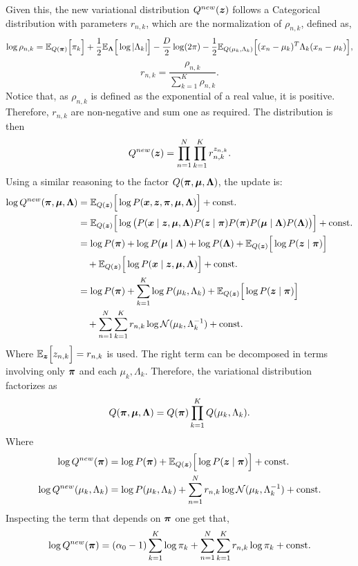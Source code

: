 Given this, the new variational distribution \(Q^{new}(\bm{z})\) follows a Categorical distribution with parameters \(r_{n,k}\), which are the normalization of \(\rho_{n,k}\), defined as,
\[
  \log \rho_{n,k} = \mathbb{E}_{Q(\bm{\pi})}\Big[\pi_{k}\Big] + \frac{1}{2}\mathbb{E}_{\bm{\Lambda}}\Big[\log | \Lambda_{k}|\Big] - \frac{D}{2} \log (2\pi) - \frac{1}{2}\mathbb{E}_{Q(\mu_{k}, \Lambda_{k})}\Big[(x_{n} - \mu_{k})^{T}\Lambda_{k}(x_{n} - \mu_{k})\Big],
\]
\[
  r_{n,k} = \frac{\rho_{n,k}}{\sum_{k=1}^{K}\rho_{n,k}}.
\]
Notice that, as \(\rho_{n,k}\) is defined as the exponential of a real value, it is positive. Therefore, \(r_{n,k}\) are non-negative and sum one as required.
The distribution is then
\[
  Q^{new}(\bm{z}) = \prod_{n=1}^{N}\prod_{k=1}^{K} r_{n,k}^{z_{n,k}}.
\]
Using a similar reasoning to the factor \(Q(\bm{\pi}, \bm{\mu}, \bm{\Lambda})\), the update is:
\[
  \begin{aligned}
    \log Q^{new}(\bm{\pi}, \bm{\mu}, \bm{\Lambda}) &= \mathbb{E}_{Q(\bm{z})}\Big[\log P(\bm{x}, \bm{z}, \bm{\pi}, \bm{\mu}, \bm{\Lambda})\Big] + \text{const.}\\
    &=  \mathbb{E}_{Q(\bm{z})}\Big[\log \big( P(\bm{x} \mid \bm{z}, \bm{\mu}, \bm{\Lambda})P(\bm{z} \mid \bm{\pi})P(\bm{\pi})P(\bm{\mu} \mid \bm{\Lambda})P(\bm{\Lambda}) \big)\Big] + \text{const.}\\
    &=  \log P(\bm{\pi}) + \log P(\bm{\mu} \mid \bm{\Lambda})+ \log P(\bm{\Lambda}) + \mathbb{E}_{Q(\bm{z})}\Big[\log P(\bm{z} \mid \bm{\pi})\Big] \\
    &\quad + \mathbb{E}_{Q(\bm{z})}\Big[\log P(\bm{x} \mid \bm{z}, \bm{\mu}, \bm{\Lambda})\Big] + \text{const.}\\
    &= \log P(\bm{\pi}) + \sum_{k=1}^{K}\log P(\mu_{k}, \Lambda_{k}) + \mathbb{E}_{Q(\bm{z})}\Big[\log P(\bm{z} \mid \bm{\pi})\Big]\\
    &\quad + \sum_{n=1}^{N}\sum_{k=1}^{K}r_{n,k} \log \mathcal{N}(\mu_{k}, \Lambda_{k}^{-1}) + \text{const.}
  \end{aligned}
\]
Where \(\mathbb{E}_{\bm{z}}\Big[z_{n,k}\Big] = r_{n,k}\) is used. The right term can be decomposed in terms involving only \(\bm{\pi}\) and each \(\mu_{k}, \Lambda_{k}\). Therefore, the variational distribution factorizes as
\[
  Q(\bm{\pi}, \bm{\mu}, \bm{\Lambda}) = Q(\bm{\pi})\prod_{k=1}^{K}Q(\mu_{k}, \Lambda_{k}).
\]
Where
\[
  \begin{aligned}
    \log Q^{new}(\bm{\pi}) &= \log P(\bm{\pi}) + \mathbb{E}_{Q(\bm{z})}\Big[\log P(\bm{z} \mid \bm{\pi})\Big] + \text{const.}\\
    \log Q^{new}(\mu_{k}, \Lambda_{k}) &= \log P(\mu_{k}, \Lambda_{k}) + \sum_{n=1}^{N}r_{n,k} \log \mathcal{N}(\mu_{k}, \Lambda_{k}^{-1}) + \text{const.}
  \end{aligned}
\]
Inspecting the term that depends on \(\bm{\pi}\) one get that,
\[
  \log Q^{new}(\bm{\pi}) = (\alpha_{0} - 1)\sum_{k=1}^{K}\log \pi_{k} + \sum_{n=1}^{N}\sum_{k=1}^{K}r_{n,k} \log \pi_{k} + \text{const}.
\]
